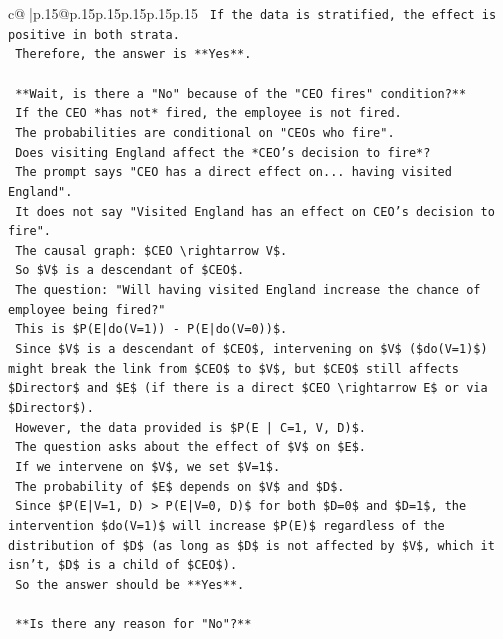 \documentclass{article}
\begin{document}
{\begin{supertabular}{c@{$\;$}|p{.15\linewidth}@{}p{.15\linewidth}p{.15\linewidth}p{.15\linewidth}p{.15\linewidth}p{.15\linewidth}}
{{{\texttt{    If the data is stratified, the effect is positive in both strata.} \\
\texttt{    Therefore, the answer is **Yes**.} \\
\\ 
\texttt{    **Wait, is there a "No" because of the "CEO fires" condition?**} \\
\texttt{    If the CEO *has not* fired, the employee is not fired.} \\
\texttt{    The probabilities are conditional on "CEOs who fire".} \\
\texttt{    Does visiting England affect the *CEO's decision to fire*?} \\
\texttt{    The prompt says "CEO has a direct effect on... having visited England".} \\
\texttt{    It does not say "Visited England has an effect on CEO's decision to fire".} \\
\texttt{    The causal graph: \$CEO \textbackslash{}rightarrow V\$.} \\
\texttt{    So \$V\$ is a descendant of \$CEO\$.} \\
\texttt{    The question: "Will having visited England increase the chance of employee being fired?"} \\
\texttt{    This is \$P(E|do(V=1)) {-} P(E|do(V=0))\$.} \\
\texttt{    Since \$V\$ is a descendant of \$CEO\$, intervening on \$V\$ (\$do(V=1)\$) might break the link from \$CEO\$ to \$V\$, but \$CEO\$ still affects \$Director\$ and \$E\$ (if there is a direct \$CEO \textbackslash{}rightarrow E\$ or via \$Director\$).} \\
\texttt{    However, the data provided is \$P(E | C=1, V, D)\$.} \\
\texttt{    The question asks about the effect of \$V\$ on \$E\$.} \\
\texttt{    If we intervene on \$V\$, we set \$V=1\$.} \\
\texttt{    The probability of \$E\$ depends on \$V\$ and \$D\$.} \\
\texttt{    Since \$P(E|V=1, D) > P(E|V=0, D)\$ for both \$D=0\$ and \$D=1\$, the intervention \$do(V=1)\$ will increase \$P(E)\$ regardless of the distribution of \$D\$ (as long as \$D\$ is not affected by \$V\$, which it isn't, \$D\$ is a child of \$CEO\$).} \\
\texttt{    So the answer should be **Yes**.} \\
\\ 
\texttt{    **Is there any reason for "No"?**} \\
}}}
\end{supertabular}}
\end{document}
